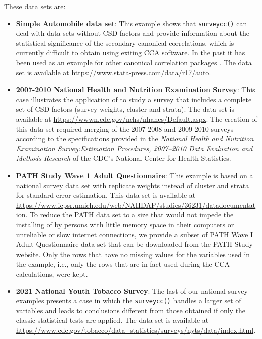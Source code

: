 These data sets are:

\begin{itemize}
\tightlist
\item
  \textbf{Simple Automobile data set}: This example shows that \texttt{surveycc()} can deal with data sets without CSD factors and provide information about the statistical significance of the secondary canonical correlations, which is currently difficult to obtain using exiting CCA software. In the past it has been used as an example for other canonical correlation packages \citep{stata2018}. The data set is available at \url{https://www.stata-press.com/data/r17/auto}.
\item
  \textbf{2007-2010 National Health and Nutrition Examination Survey}: This case illustrates the application of  to study a survey that includes a complete set of CSD factors (survey weights, cluster and strata). The data set is available at \url{https://wwwn.cdc.gov/nchs/nhanes/Default.aspx}. The creation of this data set required merging of the 2007-2008 and 2009-2010 surveys according to the specifications provided in the \emph{National Health and Nutrition Examination Survey:Estimation Procedures, 2007--2010 Data Evaluation and Methods Research} of the CDC's National Center for Health Statistics.
\item
  \textbf{PATH Study Wave 1 Adult Questionnaire}: This example is based on a national survey data set with replicate weights instead of cluster and strata for standard error estimation. This data set is available at \url{https://www.icpsr.umich.edu/web/NAHDAP/studies/36231/datadocumentation}. To reduce the PATH data set to a size that would not impede the installing of  by persons with little memory space in their computers or unreliable or slow internet connections, we provide a subset of PATH Wave I Adult Questionnaire data set that can be downloaded from the PATH Study website. Only the rows that have no missing values for the variables used in the example, i.e., only the rows that are in fact used during the CCA calculations, were kept.
\item
  \textbf{2021 National Youth Tobacco Survey}: The last of our national survey examples presents a case in which the \texttt{surveycc()} handles a larger set of variables and leads to conclusions different from those obtained if only the classic statistical tests are applied. The data set is available at \url{https://www.cdc.gov/tobacco/data_statistics/surveys/nyts/data/index.html}.
\end{itemize}

